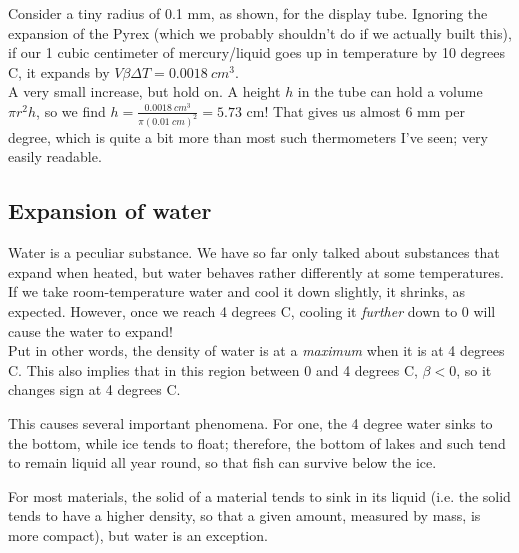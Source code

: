 Consider a tiny radius of 0.1 mm, as shown, for the display tube. Ignoring the expansion of the Pyrex (which we probably shouldn't do if we actually built this), if our 1 cubic centimeter of mercury/liquid goes up in temperature by 10 degrees C, it expands by $V \beta \Delta T = \SI{0.0018}{cm^3}$.\\
A very small increase, but hold on. A height $h$ in the tube can hold a volume $\pi r^2 h$, so we find $\displaystyle h = \frac{\SI{0.0018}{cm^3}}{\pi (\SI{0.01}{cm})^2} = 5.73$ cm! That gives us almost 6 mm per degree, which is quite a bit more than most such thermometers I've seen; very easily readable.

\subsection{Expansion of water}

Water is a peculiar substance. We have so far only talked about substances that expand when heated, but water behaves rather differently at some temperatures.\\
If we take room-temperature water and cool it down slightly, it shrinks, as expected. However, once we reach 4 degrees C, cooling it \emph{further} down to 0 will cause the water to expand!\\
Put in other words, the density of water is at a \emph{maximum} when it is at 4 degrees C. This also implies that in this region between 0 and 4 degrees C, $\beta < 0$, so it changes sign at 4 degrees C.

This causes several important phenomena. For one, the 4 degree water sinks to the bottom, while ice tends to float; therefore, the bottom of lakes and such tend to remain liquid all year round, so that fish can survive below the ice.

For most materials, the solid of a material tends to sink in its liquid (i.e. the solid tends to have a higher density, so that a given amount, measured by mass, is more compact), but water is an exception.


